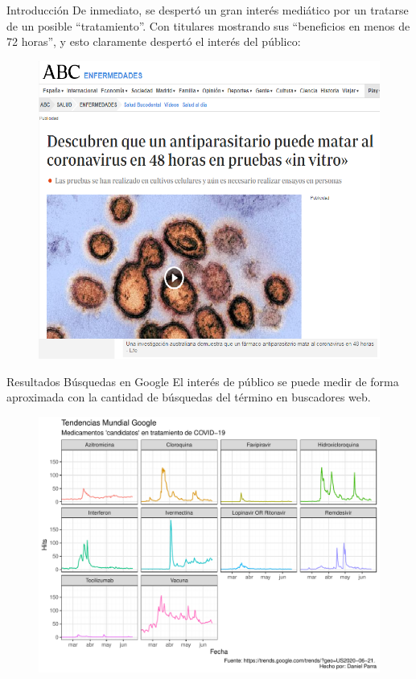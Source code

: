 \documentclass[12pt,xcolor=dvipsnames]{beamer}
\begin{document}
	\begin{frame}{Introducción}
		\small De inmediato, se despertó un gran interés mediático por un tratarse de un posible ``tratamiento''. Con titulares mostrando sus ``beneficios en menos de 72 horas'', y esto claramente despertó el interés del público:

		\begin{figure}
			\centering\includegraphics[width=0.7\linewidth]{figs/titular_1}
			\label{fig:titular1}
		\end{figure}
	\end{frame}

	\begin{frame}{Resultados Búsquedas en Google}		
		\scriptsize El interés de público se puede medir de forma aproximada con la cantidad de búsquedas del término en buscadores web. 
		\begin{figure}
			\centering
			\includegraphics[width=0.8\linewidth]{../../6_Google_Trends/figures/G2_2020-06-21}
			\label{fig:g1col2020-06-21}
		\end{figure}
	\end{frame}
\end{document}
